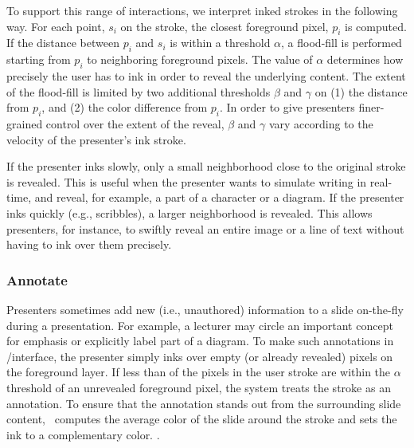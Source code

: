 To support this range of interactions, we interpret inked strokes in the following way.
%
For each point, $s_i$ on the stroke, the closest foreground pixel, $p_i$ is computed. If the distance between $p_i$ and $s_i$ is within a threshold $\alpha$, a flood-fill is performed starting from $p_i$ to neighboring foreground pixels. The value of $\alpha$ determines how precisely the user has to ink in order to reveal the underlying content. 
%
The extent of the flood-fill is limited by two additional thresholds $\beta$ and $\gamma$ on (1) the distance from $p_i$, and (2) the color difference from $p_i$. In order to give presenters finer-grained control over the extent of the reveal, $\beta$ and $\gamma$ vary according to the velocity of the presenter's ink stroke.  

If the presenter inks slowly, only a small neighborhood close to the original stroke is revealed. This is useful when the presenter wants to simulate writing in real-time, and reveal, for example, a part of a character or a diagram.
%
If the presenter inks quickly (e.g., scribbles), a larger neighborhood is revealed. This allows presenters, for instance, to swiftly reveal an entire image or a line of text without having to ink over them precisely.   
\fi

\subsubsection{Annotate}
Presenters sometimes add new (i.e., unauthored) information to a slide on-the-fly during a presentation.
%
For example, a lecturer may circle an important concept for emphasis or explicitly label part of a diagram.
%
To make such annotations in /interface, the presenter simply inks over empty (or already revealed) pixels on the foreground layer. If less than  of the pixels in the user stroke are within the $\alpha$ threshold of an unrevealed foreground pixel, the system treats the stroke as an annotation. To ensure that the annotation stands out from the surrounding slide content, \interface\ computes the average color of the slide around the stroke and sets the ink to a complementary color. . 

